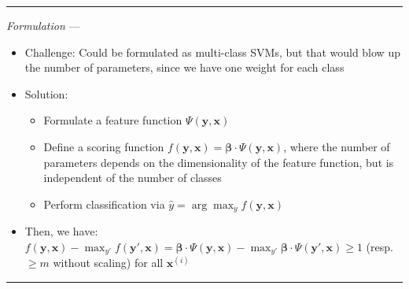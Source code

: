 {\color{lightgray}\hrule height 0.001mm}

\emph{Formulation} --- 
\begin{itemize}
    \item Challenge: Could be formulated as multi-class SVMs, but that would blow up the number of parameters, since we have one weight for each class
    \item Solution: 
    \begin{itemize}
        \item Formulate a feature function $\Psi(\boldsymbol{y}, \boldsymbol{x})$
        \item Define a scoring function $f(\boldsymbol{y}, \boldsymbol{x}) = \boldsymbol{\beta} \cdot \Psi(\boldsymbol{y}, \boldsymbol{x})$, where the number of parameters depends on the dimensionality of the feature function, but is independent of the number of classes
        \item Perform classification via $\hat{y} = \arg\max_y f(\boldsymbol{y}, \boldsymbol{x})$
    \end{itemize}
    \item Then, we have:
    $f(\boldsymbol{y}, \boldsymbol{x}) - \max_{y'} f(\boldsymbol{y}', \boldsymbol{x}) = \boldsymbol{\beta} \cdot \Psi(\boldsymbol{y}, \boldsymbol{x}) - \max_{y'} \boldsymbol{\beta} \cdot \Psi(\boldsymbol{y}', \boldsymbol{x})  \geq 1$ (resp. $\geq m$ without scaling) for all $\boldsymbol{x}^{(i)}$
\end{itemize}

{\color{lightgray}\hrule height 0.001mm}

